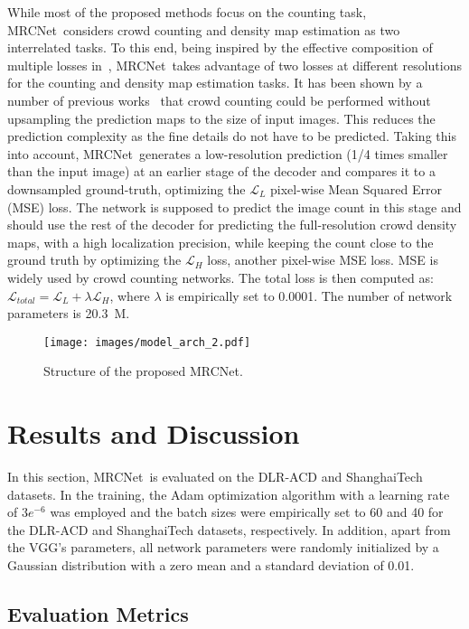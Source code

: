 \documentclass{bmvc2k}
\newcommand{\XNET}{MRCNet}
\begin{document}
While most of the proposed methods focus on the counting task, \XNET~considers crowd counting and density map estimation as two interrelated tasks. To this end, being inspired by the effective composition of multiple losses in~\cite{Idrees2018,Ranjan2018,Sindagi2017}, \XNET~takes advantage of two losses at different resolutions for the counting and density map estimation tasks.
It has been shown by a number of previous works~\cite{Zhang2016,Zeng2017,Sam2018,Liu2018b} that crowd counting could be performed without upsampling the prediction maps to the size of input images. This reduces the prediction complexity as the fine details do not have to be predicted. Taking this into account, \XNET~generates a low-resolution prediction (1/4 times smaller than the input image) at an earlier stage of the decoder and compares it to a downsampled ground-truth, optimizing the $\mathcal{L}_L$ pixel-wise Mean Squared Error (MSE) loss. The network is supposed to predict the image count in this stage and should use the rest of the decoder for predicting the full-resolution crowd density maps, with a high localization precision, while keeping the count close to the ground truth by optimizing the $\mathcal{L}_H$ loss, another pixel-wise MSE loss. MSE is widely used by crowd counting networks. The total loss is then computed as: $\mathcal{L}_{total} = \mathcal{L}_L + \lambda\mathcal{L}_H $, where $\lambda$ is empirically set to 0.0001. The number of network parameters is 20.3~M.
\begin{figure}
    \centering
    \texttt{[image: images/model\_arch\_2.pdf]}
    \caption{Structure of the proposed \XNET.}
    \label{fig:model}
\end{figure}

\section{Results and Discussion}
In this section, \XNET~is evaluated on the DLR-ACD and ShanghaiTech datasets. In the training, the Adam optimization algorithm with a learning rate of $3e^{-6}$ was employed and the batch sizes were empirically set to 60 and 40 for the DLR-ACD and ShanghaiTech datasets, respectively. In addition, apart from the VGG's parameters, all network parameters were randomly initialized by a Gaussian distribution with a zero mean and a standard deviation of 0.01.

\subsection{Evaluation Metrics}
\end{document}
